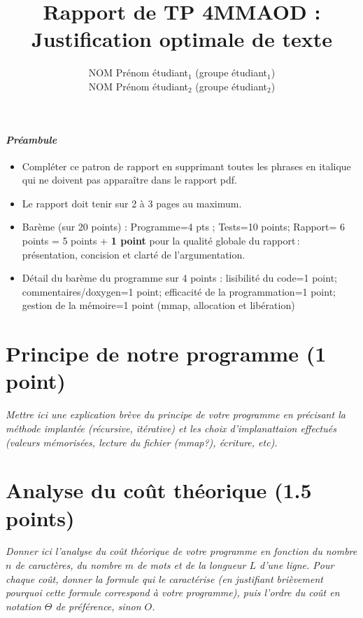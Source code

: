 \documentclass[a4paper,10pt,french]{article}
\title{Rapport de TP 4MMAOD : Justification optimale de texte}
\author{
NOM Prénom étudiant$_1$ (groupe étudiant$_1$) 
\\ NOM Prénom étudiant$_2$ (groupe étudiant$_2$) 
}
\begin{document}
\maketitle

\paragraph{\em Préambule}
{\em \begin{itemize} 
   \item Compléter ce patron de rapport en supprimant toutes les phrases en italique qui ne doivent pas apparaître dans le rapport pdf.
   \item Le rapport doit tenir sur 2 à 3 pages au maximum.
   \item Barème (sur 20 points) : Programme=4 pts ; Tests=10 points; Rapport= 6 points = 5 points + {\bf 1 point} pour la qualité globale du rapport\,: présentation, concision et clarté de l'argumentation.
   \item Détail du barème du programme sur 4 points :  lisibilité du code=1 point; commentaires/doxygen=1 point; 
      efficacité de la programmation=1 point; gestion de la mémoire=1 point (mmap, allocation et libération)
\end{itemize}
}

\section{Principe de notre  programme (1 point)}
{\em Mettre ici une explication brève du principe de votre programme en  précisant la méthode implantée (récursive, itérative) et les
choix d'implanattaion effectués (valeurs mémorisées, lecture du fichier (mmap?), écriture, etc).
\\
} 

\section{Analyse du coût théorique (1.5 points)}
{\em Donner ici l'analyse du coût théorique de votre programme en fonction du nombre $n$ de caractères, du nombre $m$ de mots et de
la longueur $L$ d'une ligne.
 Pour chaque coût, donner la formule qui le caractérise (en justifiant brièvement pourquoi cette formule correspond à votre programme), 
 puis l'ordre du coût en notation $\Theta$ de préférence, sinon $O$.}
\end{document}
